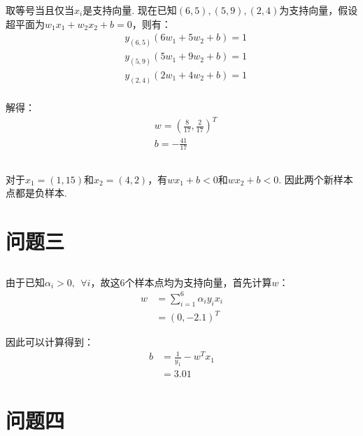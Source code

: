\documentclass[12pt, a4paper]{article}
\begin{document}
取等号当且仅当$x_i$是支持向量. 现在已知$(6,5),(5,9),(2,4)$为支持向量，假设超平面为$w_1x_1+w_2x_2+b=0$，则有：
\begin{align*}
    &y_{(6,5)}(6w_1+5w_2+b)=1\\
    &y_{(5,9)}(5w_1+9w_2+b)=1\\
    &y_{(2,4)}(2w_1+4w_2+b)=1\\
\end{align*}

解得：
\begin{align*}
    &w=(\frac{8}{17},\frac{2}{17})^T\\
    &b=-\frac{41}{17}
\end{align*}

\subsection{}

对于$x_1=(1,15)$和$x_2=(4,2)$，有$wx_1+b<0$和$wx_2+b<0$. 因此两个新样本点都是负样本. 

\subsection{}



\section{问题三}


\subsection{}

由于已知$\alpha_i > 0, \ \ \forall i$，故这6个样本点均为支持向量，首先计算$w$：
\begin{align*}
    w&=\sum_{i=1}^{6}\alpha_i y_i x_i\\
    &=(0, -2.1)^T
\end{align*}

因此可以计算得到：
\begin{align*}
    b&=\frac{1}{y_1}-w^T x_1\\
    &=3.01
\end{align*}

\subsection{}


\subsection{}



\section{问题四}


\subsection{}



\subsection{}


\subsection{}
\end{document}

